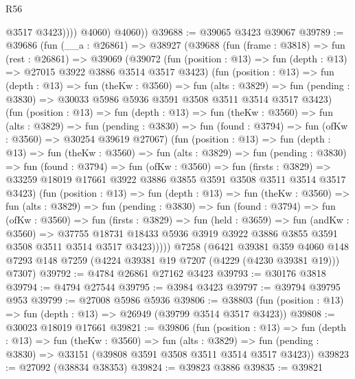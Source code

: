 \begin{lexlean}{R56}
\begin{coremodule}
                  @3517
                  @3423))))
          @4060)
        @4060))
@39688 := @39065 @3423 @39067
@39789 := @39686
    (fun (__a : @26861) =>
    @38927
      (@39688
        (fun (frame : @3818) =>
        fun (rest : @26861) =>
        @39069
          (@39072
            (fun (position : @13) => fun (depth : @13) => @27015 @3922 @3886 @3514 @3517 @3423)
            (fun (position : @13) =>
            fun (depth : @13) =>
            fun (theKw : @3560) =>
            fun (alts : @3829) =>
            fun (pending : @3830) => @30033 @5986 @5936 @3591 @3508 @3511 @3514 @3517 @3423)
            (fun (position : @13) =>
            fun (depth : @13) =>
            fun (theKw : @3560) =>
            fun (alts : @3829) =>
            fun (pending : @3830) =>
            fun (found : @3794) => fun (ofKw : @3560) => @30254 @39619 @27067)
            (fun (position : @13) =>
            fun (depth : @13) =>
            fun (theKw : @3560) =>
            fun (alts : @3829) =>
            fun (pending : @3830) =>
            fun (found : @3794) =>
            fun (ofKw : @3560) =>
            fun (firsts : @3829) =>
            @33259 @18019 @17661 @3922 @3886 @3855 @3591 @3508 @3511 @3514 @3517 @3423)
            (fun (position : @13) =>
            fun (depth : @13) =>
            fun (theKw : @3560) =>
            fun (alts : @3829) =>
            fun (pending : @3830) =>
            fun (found : @3794) =>
            fun (ofKw : @3560) =>
            fun (firsts : @3829) =>
            fun (held : @3659) =>
            fun (andKw : @3560) =>
            @37755
              @18731
              @18433
              @5936
              @3919
              @3922
              @3886
              @3855
              @3591
              @3508
              @3511
              @3514
              @3517
              @3423)))))
    @7258
    (@6421
      @39381
      @359
      @4060
      @148
      @7293
      @148
      @7259
      (@4224 @39381 @19 @7207 (@4229 (@4230 @39381 @19)))
      @7307)
@39792 := @4784 @26861 @27162 @3423
@39793 := @30176 @3818
@39794 := @4794 @27544
@39795 := @3984 @3423
@39797 := @39794 @39795 @953
@39799 := @27008 @5986 @5936
@39806 := @38803 (fun (position : @13) => fun (depth : @13) => @26949 (@39799 @3514 @3517 @3423))
@39808 := @30023 @18019 @17661
@39821 := @39806
    (fun (position : @13) =>
    fun (depth : @13) =>
    fun (theKw : @3560) =>
    fun (alts : @3829) =>
    fun (pending : @3830) => @33151 (@39808 @3591 @3508 @3511 @3514 @3517 @3423))
@39823 := @27092 (@38834 @38353)
@39824 := @39823 @3886
@39835 := @39821

\end{coremodule}
\end{lexlean}
